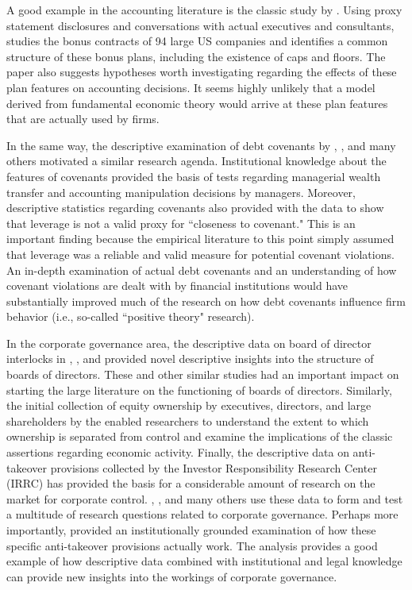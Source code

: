 \documentclass[12pt,reqno,titlepage]{amsart}
\begin{document}
\begin{doublespace}
A good example in the accounting literature is the classic study by \citet{Healy:1985jg}.  
Using proxy statement disclosures and conversations with actual executives and consultants, \citet{Healy:1985jg} studies the bonus contracts of 94 large US companies and identifies a common structure of these bonus plans, including the existence of caps and floors. 
The paper also suggests hypotheses worth investigating regarding the effects of these plan features on accounting decisions.
It seems highly unlikely that a model derived from fundamental economic theory would arrive at these plan features that are actually used by firms. 

In the same way, the descriptive examination of debt covenants by \citet{SmithJr:1979hv}, \cite{Kalay:1982gv}, and many others motivated a similar research agenda.
Institutional knowledge about the features of covenants provided the basis of tests regarding managerial wealth transfer and accounting manipulation decisions by managers.
Moreover, descriptive statistics regarding covenants also provided \cite{Dichev:2002} with the data to show that leverage is not a valid proxy for ``closeness to covenant."
This is an important finding because the empirical literature to this point simply assumed that leverage was a reliable and valid measure for potential covenant violations.  
An in-depth examination of actual debt covenants and an understanding of how covenant violations are dealt with by financial institutions would have substantially improved much of the research on how debt covenants influence firm behavior (i.e., so-called ``positive theory" research).

In the corporate governance area, the descriptive data on board of director interlocks in \citet{brandeis1913breaking}, \citet{us1951report}, and \cite{united1978interlocking} provided novel descriptive insights into the structure of boards of directors.
These and other similar studies had an important impact on starting the large literature on the functioning of boards of directors. 
Similarly, the initial collection of equity ownership by executives, directors, and large shareholders by the \cite{securities1936official} enabled researchers to understand the extent to which ownership is separated from control and examine the implications of the classic \cite{berle1932modern} assertions regarding economic activity.
Finally, the descriptive data on anti-takeover provisions collected by the Investor Responsibility Research Center (IRRC) has provided the basis for a considerable amount of research on the market for corporate control. 
\cite{Gompers:2003tl}, \cite{Bebchuk:2009ii}, and many others use these data to form and test a multitude of research questions related to corporate governance.  
Perhaps more importantly, \cite{Daines:2001hi} provided an institutionally grounded examination of how these specific anti-takeover provisions actually work.  
The \cite{Daines:2001hi} analysis provides a good example of how descriptive data combined with institutional and legal knowledge can provide new insights into the workings of corporate governance.


\end{doublespace}
\end{document}
